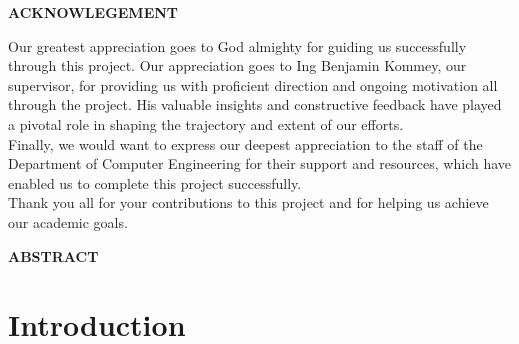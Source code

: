 \documentclass[12pt, a4paper]{article}
\begin{document}
\begin{center}
\textbf{ACKNOWLEGEMENT}
\end{center}
Our greatest appreciation goes to God almighty for guiding us successfully through this project. Our appreciation goes to Ing Benjamin Kommey, our supervisor, for providing us with proficient direction and ongoing motivation all through the project. His valuable insights and constructive feedback have played a pivotal role in shaping the trajectory and extent of our efforts.\\
Finally, we would want to express our deepest appreciation to the staff of the Department of Computer Engineering for their support and resources, which have enabled us to complete this project successfully.\\ Thank you all for your contributions to this project and for helping us achieve our academic goals.
\newpage

\begin{center}
\textbf{ABSTRACT}
\end{center}

\newpage


\tableofcontents
\newpage
{}
\section{Introduction}
\end{document}
